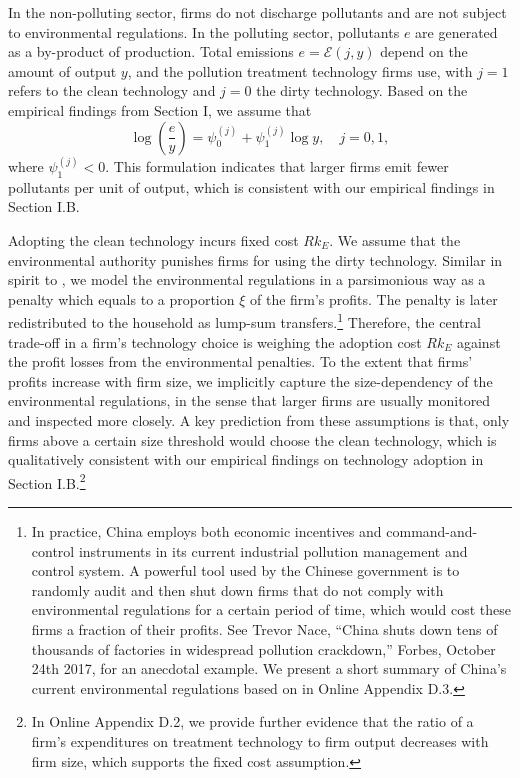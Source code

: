 \documentclass[AEJ]{AEA}
\begin{document}
In the non-polluting sector, firms do not discharge pollutants and are not subject to environmental regulations. In the polluting sector, pollutants $e$ are generated as a by-product of production. Total emissions $e = \mathcal{E}(j,y)$ depend on the amount of output $y$, and the pollution treatment technology firms use, with $j = 1$ refers to the clean technology and $j = 0$ the dirty technology. Based on the empirical findings from Section I, we assume that
\begin{equation}
\label{eq:intensity_size}
    \log\left(\frac{e}{y}\right) = \psi_0^{(j)}+ \psi_1^{(j)} \log y, \quad j = 0,1,
\end{equation}
where $\psi_1^{(j)}<0$. This formulation indicates that larger firms emit fewer pollutants per unit of output, which is consistent with our empirical findings in Section I.B.

Adopting the clean technology incurs fixed cost $R k_E$. We assume that the environmental authority punishes firms for using the dirty technology. Similar in spirit to \citet{ShapiroWalker:2015}, we model the environmental regulations in a parsimonious way as a penalty which equals to a proportion $\xi$ of the firm's profits. The penalty is later redistributed to the household as lump-sum transfers.\footnote{In practice, China employs both economic incentives and command-and-control instruments in its current industrial pollution management and control system. A powerful tool used by the Chinese government is to randomly audit and then shut down firms that do not comply with environmental regulations for a certain period of time, which would cost these firms a fraction of their profits. See Trevor Nace, ``China shuts down tens of thousands of factories in widespread pollution crackdown,'' Forbes, October 24th 2017, for an anecdotal example.  We present a short summary of China's current environmental regulations based on \citet{Lin:2013} in Online Appendix D.3.} Therefore, the central trade-off in a firm's technology choice is weighing the adoption cost $R k_E$ against the profit losses from the environmental penalties. To the extent that firms' profits increase with firm size, we implicitly capture the size-dependency of the environmental regulations, in the sense that larger firms are usually monitored and inspected more closely. A key prediction from these assumptions is that, only firms above a certain size threshold would choose the clean technology, which is qualitatively consistent with our empirical findings on technology adoption in Section I.B.\footnote{In Online Appendix D.2, we provide further evidence that the ratio of a firm's expenditures on treatment technology to firm output decreases with firm size, which supports the fixed cost assumption.}
\end{document}
